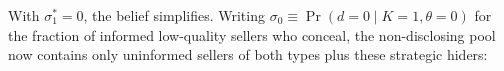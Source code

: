 With $\sigma_1^*=0$, the belief simplifies. Writing $\sigma_0\equiv\Pr(d=0\mid K=1,\theta=0)$ for the fraction of informed low-quality sellers who conceal, the non-disclosing pool now contains only uninformed sellers of both types plus these strategic hiders:
